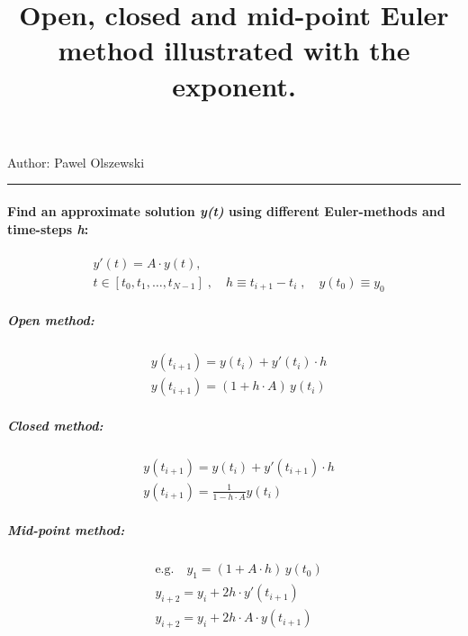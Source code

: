 \documentclass[11pt]{article}
\title{Open, closed and mid-point Euler method illustrated with the exponent.}
\begin{document}
    
    
    \maketitle
    
    

    
    Author: Pawel Olszewski

    \begin{center}\rule{0.5\linewidth}{\linethickness}\end{center}

\hypertarget{find-an-approximate-solution-yt-using-different-euler-methods-and-time-steps-h}{%
\paragraph{\texorpdfstring{Find an approximate solution \emph{y(t)}
using different Euler-methods and time-steps
\emph{h}:}{Find an approximate solution y(t) using different Euler-methods and time-steps h:}}\label{find-an-approximate-solution-yt-using-different-euler-methods-and-time-steps-h}}

\begin{align}
& y'(t) = A \cdot  y(t) ,\\
& t \in \left[ t_0, t_1, \ldots, t_{N-1} \right]
 \;, \quad
 h\equiv t_{i+1}-t_i
 \;,\quad 
 y(t_0) \equiv y_0
\end{align}

\hypertarget{open-method}{%
\subparagraph{\texorpdfstring{\emph{Open}
method:}{Open method:}}\label{open-method}}

\begin{align}
&y(t_{i+1}) = y(t_i) + y'(t_i) \cdot h \\
&y(t_{i+1}) = (1 + h \cdot A) \,y(t_i)
\end{align}

\hypertarget{closed-method}{%
\subparagraph{\texorpdfstring{\emph{Closed}
method:}{Closed method:}}\label{closed-method}}

\begin{align}
& y(t_{i+1}) = y(t_i) + y'(t_{i+1}) \cdot h \\
& y(t_{i+1}) = \frac{1}{1 - h \cdot A} y(t_i)
\end{align}

\hypertarget{mid-point-method}{%
\subparagraph{\texorpdfstring{\emph{Mid-point}
method:}{Mid-point method:}}\label{mid-point-method}}

\begin{align}
&\text{e.g.}\quad y_1 = (1 + A\cdot h) \,y(t_0) \\
&y_{i+2} = y_{i} + 2h \cdot y'(t_{i+1}) \\
&y_{i+2} = y_{i} + 2h \cdot A \cdot y(t_{i+1})
\end{align}
\end{document}
